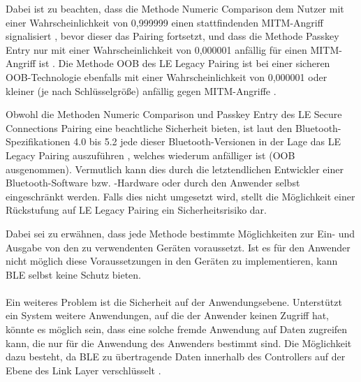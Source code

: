 Dabei ist zu beachten, dass die Methode Numeric Comparison dem Nutzer mit einer Wahrscheinlichkeit von 0,999999 einen stattfindenden MITM-Angriff signalisiert \cite{BtSpec4.2_2309}, bevor dieser das Pairing fortsetzt, und dass die Methode Passkey Entry nur mit einer Wahrscheinlichkeit von 0,000001 anfällig für einen MITM-Angriff ist \cite{BtSpec4.2_2304} \cite{BtSpec4.2_2311}. Die Methode OOB des LE Legacy Pairing ist bei einer sicheren OOB-Technologie ebenfalls mit einer Wahrscheinlichkeit von 0,000001 oder kleiner (je nach Schlüsselgröße) anfällig gegen MITM-Angriffe \cite{BtSpec4.2_2305}.

Obwohl die Methoden Numeric Comparison und Passkey Entry des LE Secure Connections Pairing eine beachtliche Sicherheit bieten, ist laut den Bluetooth-Spezifikationen 4.0 bis 5.2 jede dieser Bluetooth-Versionen in der Lage das LE Legacy Pairing auszuführen \cite{BtSpec4.2_248_b} \cite{BtSpec5.2_277}, welches wiederum anfälliger ist (OOB ausgenommen). 
Vermutlich kann dies durch die letztendlichen Entwickler einer Bluetooth-Software bzw. -Hardware oder durch den Anwender selbst eingeschränkt werden. Falls dies nicht umgesetzt wird, stellt die Möglichkeit einer Rückstufung auf LE Legacy Pairing ein Sicherheitsrisiko dar.

Dabei sei zu erwähnen, dass jede Methode bestimmte Möglichkeiten zur Ein- und Ausgabe von den zu verwendenten Geräten voraussetzt. Ist es für den Anwender nicht möglich diese Voraussetzungen in den Geräten zu implementieren, kann BLE selbst keine Schutz bieten.\\\\

Ein weiteres Problem ist die Sicherheit auf der Anwendungsebene. Unterstützt ein System weitere Anwendungen, auf die der Anwender keinen Zugriff hat, könnte es möglich sein, dass eine solche fremde Anwendung auf Daten zugreifen kann, die nur für die Anwendung des Anwenders bestimmt sind. Die Möglichkeit dazu besteht, da BLE zu übertragende Daten innerhalb des Controllers auf der Ebene des Link Layer verschlüsselt \cite{BtSpec4.0_196} \cite{BtSpec4.0_2285}. 

